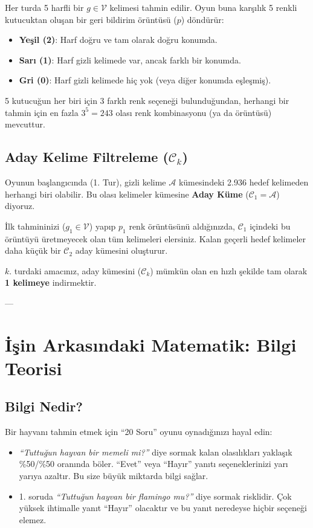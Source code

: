 \documentclass[11pt,a4paper]{article}
\begin{document}
Her turda 5 harfli bir $g \in \mathcal{V}$ kelimesi tahmin edilir. Oyun buna karşılık 5 renkli kutucuktan oluşan bir geri bildirim örüntüsü ($p$) döndürür:
\begin{itemize}[itemsep=3pt]
    \item \textbf{Yeşil (2)}: Harf doğru ve tam olarak doğru konumda.
    \item \textbf{Sarı (1)}: Harf gizli kelimede var, ancak farklı bir konumda.
    \item \textbf{Gri (0)}: Harf gizli kelimede hiç yok (veya diğer konumda eşleşmiş).
\end{itemize}

5 kutucuğun her biri için 3 farklı renk seçeneği bulunduğundan, herhangi bir tahmin için en fazla $3^5 = 243$ olası renk kombinasyonu (ya da örüntüsü) mevcuttur.

\subsection{\texorpdfstring{Aday Kelime Filtreleme ($\mathcal{C}_k$)}{Aday Kelime Filtreleme}}
Oyunun başlangıcında (1. Tur), gizli kelime $\mathcal{A}$ kümesindeki 2.936 hedef kelimeden herhangi biri olabilir. Bu olası kelimeler kümesine \textbf{Aday Küme} ($\mathcal{C}_1 = \mathcal{A}$) diyoruz.

İlk tahmininizi ($g_1 \in \mathcal{V}$) yapıp $p_1$ renk örüntüsünü aldığınızda, $\mathcal{C}_1$ içindeki bu örüntüyü üretmeyecek olan tüm kelimeleri elersiniz. Kalan geçerli hedef kelimeler daha küçük bir $\mathcal{C}_2$ aday kümesini oluşturur.

$k$. turdaki amacınız, aday kümesini ($\mathcal{C}_k$) mümkün olan en hızlı şekilde tam olarak \textbf{1 kelimeye} indirmektir.

---

\section{İşin Arkasındaki Matematik: Bilgi Teorisi}

\subsection{Bilgi Nedir?}
Bir hayvanı tahmin etmek için ``20 Soru'' oyunu oynadığınızı hayal edin:
\begin{itemize}[itemsep=2pt]
    \item \textit{``Tuttuğun hayvan bir memeli mi?''} diye sormak kalan olasılıkları yaklaşık \%50/\%50 oranında böler. ``Evet'' veya ``Hayır'' yanıtı seçeneklerinizi yarı yarıya azaltır. Bu size büyük miktarda bilgi sağlar.
    \item 1. soruda \textit{``Tuttuğun hayvan bir flamingo mu?''} diye sormak risklidir. Çok yüksek ihtimalle yanıt ``Hayır'' olacaktır ve bu yanıt neredeyse hiçbir seçeneği elemez.
\end{itemize}
\end{document}
